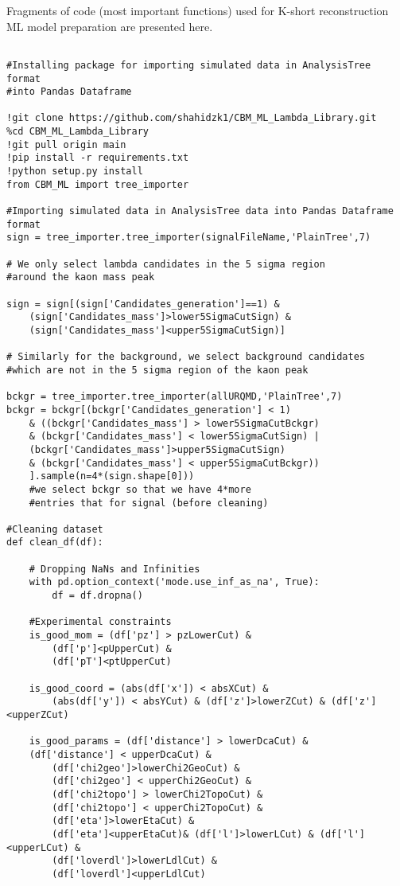 \pagestyle{fancy}
\thispagestyle{fancy}
Fragments of code (most important functions) used for K-short reconstruction ML model preparation are presented here.

\lstset{language=Python}
\begin{lstlisting}

#Installing package for importing simulated data in AnalysisTree format 
#into Pandas Dataframe 

!git clone https://github.com/shahidzk1/CBM_ML_Lambda_Library.git
%cd CBM_ML_Lambda_Library
!git pull origin main
!pip install -r requirements.txt
!python setup.py install
from CBM_ML import tree_importer

#Importing simulated data in AnalysisTree data into Pandas Dataframe format 
sign = tree_importer.tree_importer(signalFileName,'PlainTree',7)

# We only select lambda candidates in the 5 sigma region 
#around the kaon mass peak

sign = sign[(sign['Candidates_generation']==1) &
    (sign['Candidates_mass']>lower5SigmaCutSign) &
    (sign['Candidates_mass']<upper5SigmaCutSign)]

# Similarly for the background, we select background candidates 
#which are not in the 5 sigma region of the kaon peak

bckgr = tree_importer.tree_importer(allURQMD,'PlainTree',7)
bckgr = bckgr[(bckgr['Candidates_generation'] < 1)
    & ((bckgr['Candidates_mass'] > lower5SigmaCutBckgr)
    & (bckgr['Candidates_mass'] < lower5SigmaCutSign) |
    (bckgr['Candidates_mass']>upper5SigmaCutSign) 
    & (bckgr['Candidates_mass'] < upper5SigmaCutBckgr))
    ].sample(n=4*(sign.shape[0])) 
    #we select bckgr so that we have 4*more 
    #entries that for signal (before cleaning)

#Cleaning dataset
def clean_df(df):

    # Dropping NaNs and Infinities
    with pd.option_context('mode.use_inf_as_na', True):
        df = df.dropna()
        
    #Experimental constraints
    is_good_mom = (df['pz'] > pzLowerCut) &
        (df['p']<pUpperCut) & 
        (df['pT']<ptUpperCut)
        
    is_good_coord = (abs(df['x']) < absXCut) &
        (abs(df['y']) < absYCut) & (df['z']>lowerZCut) & (df['z']<upperZCut)
        
    is_good_params = (df['distance'] > lowerDcaCut) &
    (df['distance'] < upperDcaCut) &
        (df['chi2geo']>lowerChi2GeoCut) & 
        (df['chi2geo'] < upperChi2GeoCut) &
        (df['chi2topo'] > lowerChi2TopoCut) &
        (df['chi2topo'] < upperChi2TopoCut) & 
        (df['eta']>lowerEtaCut) &
        (df['eta']<upperEtaCut)& (df['l']>lowerLCut) & (df['l']<upperLCut) &
        (df['loverdl']>lowerLdlCut) &
        (df['loverdl']<upperLdlCut)
        

\end{lstlisting}
